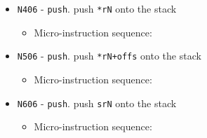 \documentclass{article}
\def\specialtodata#1{\Verb|#1002| - output \Verb|sr#1| to data bus}
\def\pkptrout{\Verb|0202| - output *\Verb|pk| to data bus}
\def\sptoaddr{\Verb|1102| - output \Verb|sp| to addr bus}
\def\datatooffs{\Verb|4402| - write to \Verb|offs| from data bus}
\def\decrementsp{\Verb|1602| - decrement \Verb|sp|}
\def\regptodata#1{\Verb|#1203| - output *\Verb|r#1| to data bus}
\def\regptodatao#1{\Verb|#1303| - output *(\Verb|r#1|+\Verb|offs|) to data bus}
\def\writeRAM{\Verb|0004| - write data bus to *(addr bus)}
\def\writeRAMo{\Verb|0104| - write data bus to *(addr bus+\Verb|offs|)}
\def\echodatalong{\Verb|0025| - echo data bus to itself for 3 cycles}
\def\done{\Verb|fffe| - end instruction}
\begin{document}
\begin{itemize}
    \item \Verb|N406| - \Verb|push|. push \Verb|*rN| onto the stack
    \begin{itemize}
        \item Micro-instruction sequence:
    \end{itemize}

    
    \item \Verb|N506| - \Verb|push|. push \Verb|*rN+offs| onto the stack
    \begin{itemize}
        \item Micro-instruction sequence:
    \end{itemize}

    
    \item \Verb|N606| - \Verb|push|. push \Verb|srN| onto the stack
    \begin{itemize}
        \item Micro-instruction sequence:
    \end{itemize}


\end{itemize}
\end{document}

